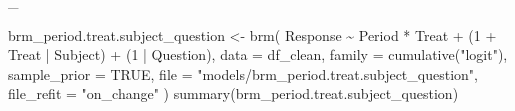 \documentclass[
  12pt,
  a4paper,
  extrafontsizes,
  onecolumn,
  openright]{memoir}
\newenvironment{Shaded}{\begin{snugshade}}{\end{snugshade}}
\newcommand{\AttributeTok}[1]{\textcolor[rgb]{0.40,0.45,0.13}{#1}}
\newcommand{\ConstantTok}[1]{\textcolor[rgb]{0.56,0.35,0.01}{#1}}
\newcommand{\DecValTok}[1]{\textcolor[rgb]{0.68,0.00,0.00}{#1}}
\newcommand{\FunctionTok}[1]{\textcolor[rgb]{0.28,0.35,0.67}{#1}}
\newcommand{\NormalTok}[1]{\textcolor[rgb]{0.00,0.23,0.31}{#1}}
\newcommand{\OtherTok}[1]{\textcolor[rgb]{0.00,0.23,0.31}{#1}}
\newcommand{\SpecialCharTok}[1]{\textcolor[rgb]{0.37,0.37,0.37}{#1}}
\newcommand{\StringTok}[1]{\textcolor[rgb]{0.13,0.47,0.30}{#1}}
\begin{document}
\_

\begin{Shaded}
\begin{Highlighting}[]
\NormalTok{brm\_period.treat.subject\_question }\OtherTok{\textless{}{-}} \FunctionTok{brm}\NormalTok{(}
\NormalTok{    Response }\SpecialCharTok{\textasciitilde{}}\NormalTok{ Period }\SpecialCharTok{*}\NormalTok{ Treat }\SpecialCharTok{+}\NormalTok{ (}\DecValTok{1} \SpecialCharTok{+}\NormalTok{ Treat }\SpecialCharTok{|}\NormalTok{ Subject) }\SpecialCharTok{+}\NormalTok{ (}\DecValTok{1} \SpecialCharTok{|}\NormalTok{ Question),}
    \AttributeTok{data =}\NormalTok{ df\_clean,}
    \AttributeTok{family =} \FunctionTok{cumulative}\NormalTok{(}\StringTok{"logit"}\NormalTok{),}
    \AttributeTok{sample\_prior =} \ConstantTok{TRUE}\NormalTok{,}
    \AttributeTok{file =} \StringTok{"models/brm\_period.treat.subject\_question"}\NormalTok{,}
    \AttributeTok{file\_refit =} \StringTok{"on\_change"}
\NormalTok{)}
\FunctionTok{summary}\NormalTok{(brm\_period.treat.subject\_question)}
\end{Highlighting}
\end{Shaded}
\end{document}
